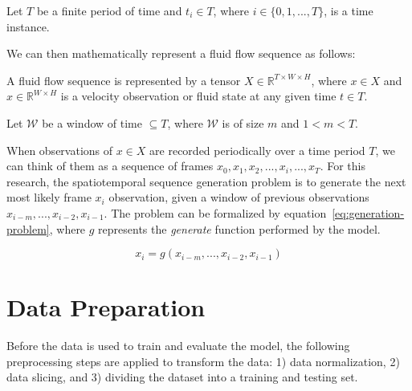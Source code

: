 \begin{defn}
    \label{defn:T}
    Let $T$ be a finite period of time and $t_i \in T$, where $i \in \{0,1,..., T\}$, is a time instance.
\end{defn}

We can then mathematically represent a fluid flow sequence as follows:

\begin{defn}
    \label{defn:fluid_flow_sequence}
    A fluid flow sequence is represented by a tensor $X \in \mathbb{R}^{T \times W \times H}$, where $x\in X$ and $x \in \mathbb{R}^{W \times H}$ is a velocity observation or fluid state at any given time $t \in T$.
\end{defn}

\begin{defn}
    \label{defn:window}
    Let $\mathcal{W}$ be a window of time $\subseteq T$, where $\mathcal{W}$ is of size $m$ and $1 < m < T$.
\end{defn}

When observations of $x \in X$ are recorded periodically over a time period $T$, we can think of them as a sequence of frames $x_0, x_1, x_2, ..., x_i, ..., x_T$. For this research, the spatiotemporal sequence generation problem is to generate the next most likely frame $x_i$ observation, given a window of previous observations $x_{i-m}, ..., x_{i-2}, x_{i-1}$. The problem can be formalized by equation~\ref{eq:generation-problem}, where $g$ represents the \textit{generate} function performed by the model.

\begin{equation}
    x_i = g(x_{i-m}, ..., x_{i-2}, x_{i-1}) 
    \label{eq:generation-problem}
\end{equation}

\section{Data Preparation}
\label{sec:DataPreparation}
Before the data is used to train and evaluate the model, the following preprocessing steps are applied to transform the data: 1) data normalization, 2) data slicing, and 3) dividing the dataset into a training and testing set.

